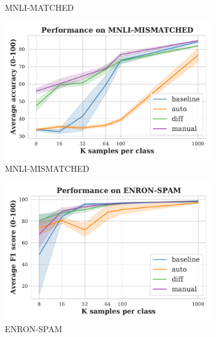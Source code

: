 \begin{figure}[!ht]
\begin{subfigure}{.33\textwidth}
  \caption{MNLI-MATCHED}
  \label{fig:matched}
\end{subfigure}
\begin{subfigure}{.33\textwidth}
  \centering
  \includegraphics[width=\linewidth]{figures/evaluation_media/MNLI-MISMATCHED_prompting_performance.pdf}
  \caption{MNLI-MISMATCHED}
  \label{fig:mismatched}
\end{subfigure}%
\begin{subfigure}{.33\textwidth}
  \centering
  \includegraphics[width=\linewidth]{figures/evaluation_media/ENRON-SPAM_prompting_performance.pdf}
  \caption{ENRON-SPAM}
  \label{fig:enron}
\end{subfigure}
\begin{subfigure}{.33\textwidth}
  \centering

\end{subfigure}
\end{figure}
